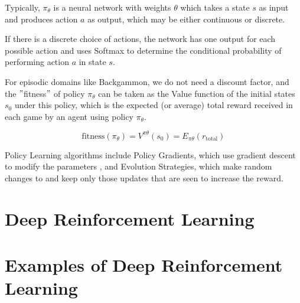 \documentclass[11pt]{article}
\begin{document}
Typically, $\pi_{\theta}$ is a neural network with weights $\theta$ which takes
a state $s$ as input and produces action $a$ as output, which may be either
continuous or discrete.

If there is a discrete choice of actions, the network has one output for each
possible action and uses Softmax to determine the conditional probability  of
performing action $a$ in state $s$.

For episodic domains like Backgammon, we do not need a discount factor, and the
\("\)fitness\("\) of policy $\pi_{\theta}$ can be taken as the Value function of the initial
states $s_0$ under this policy, which is the expected (or average) total reward
received in each game by an agent using policy $\pi_{\theta}$.

\[\text{fitness}(\pi_{\theta}) = V^{\pi \theta}(s_0) = E_{\pi \theta} (r_{\text{total}})\]

Policy Learning algorithms include Policy Gradients, which use gradient descent
to modify the parameters , and Evolution Strategies, which make random changes
to  and keep only those updates that are seen to increase the reward.

\section{Deep Reinforcement Learning}\label{sec:deep-reinforcement-learning}


\section{Examples of Deep Reinforcement Learning}\label{sec:examples-of-deep-reinforcement-learning}
\end{document}
